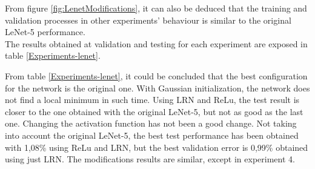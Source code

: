 From figure \ref{fig:LenetModifications},  it can also be deduced that the training and validation processes in other experiments' behaviour is similar to the original LeNet-5 performance.\\


The results obtained at validation and testing for each experiment are exposed in table \ref{Experiments-lenet}.

\begin{table}[tb]
\centering
{}
\caption{Lenet-5 experiments results.}
\label{Experiments-lenet}
\end{table}

From table \ref{Experiments-lenet}, it could be concluded that the best configuration for the network is the original one. With Gaussian initialization, the network does not find a local minimum in such time. Using LRN and ReLu, the test result is closer to the one obtained with the original LeNet-5, but not as good as the last one. Changing the activation function has not been a good change. Not taking into account the original LeNet-5, the best test performance has been obtained with 1,08\% using ReLu and LRN, but the best validation error is 0,99\% obtained using just LRN. The modifications results are similar, except in experiment 4.

